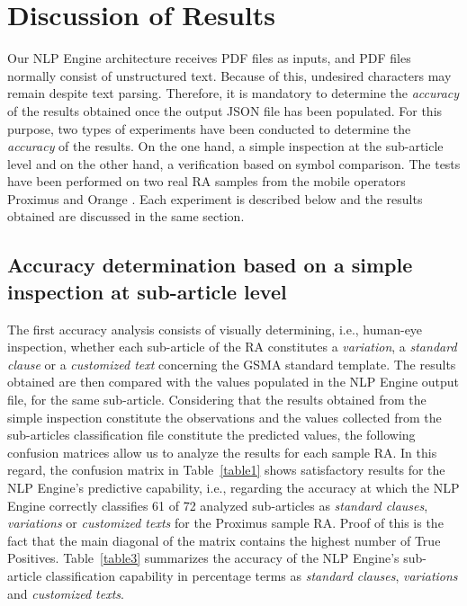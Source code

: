 \section{Discussion of Results}\label{sec:results}
Our NLP Engine architecture receives PDF files as inputs, and PDF files normally consist of unstructured text. Because of this, undesired characters may remain despite text parsing. Therefore, it is mandatory to determine the \textit{accuracy} of the results obtained once the output JSON file has been populated. For this purpose, two types of experiments have been conducted to determine the \textit{accuracy} of the results. On the one hand, a simple inspection at the sub-article level and on the other hand, a verification based on symbol comparison. The tests have been performed on two real RA samples from the mobile operators Proximus and Orange \cite{proximus}. Each experiment is described below and the results obtained are discussed in the same section.

\subsection{Accuracy determination based on a simple inspection at sub-article level}
The first accuracy analysis consists of visually determining, i.e., human-eye inspection, whether each sub-article of the RA constitutes a \textit{variation}, a \textit{standard clause} or a \textit{customized text} concerning the GSMA standard template. The results obtained are then compared with the values populated in the NLP Engine output file, for the same sub-article. Considering that the results obtained from the simple inspection constitute the observations and the values collected from the sub-articles classification file constitute the predicted values, the following confusion matrices allow us to analyze the results for each sample RA. In this regard, the confusion matrix in Table~\ref{table1}  shows satisfactory results for the NLP Engine's predictive capability, i.e., regarding the accuracy at which the NLP Engine correctly classifies 61 of 72 analyzed sub-articles as \textit{standard clauses}, \textit{variations} or \textit{customized texts} for the Proximus sample RA. Proof of this is the fact that the main diagonal of the matrix contains the highest number of True Positives. Table~\ref{table3} summarizes the accuracy of the NLP Engine's sub-article classification capability in percentage terms as \textit{standard clauses}, \textit{variations} and \textit{customized texts}.

